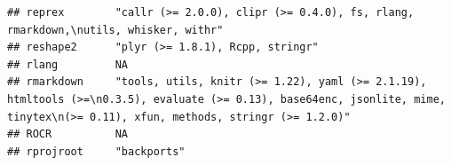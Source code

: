 \documentclass[]{article}
\begin{document}
\begin{verbatim}
## reprex        "callr (>= 2.0.0), clipr (>= 0.4.0), fs, rlang, rmarkdown,\nutils, whisker, withr"                                                                                                                                                                                                                                                                                                                                                                                                    
## reshape2      "plyr (>= 1.8.1), Rcpp, stringr"                                                                                                                                                                                                                                                                                                                                                                                                                                                      
## rlang         NA                                                                                                                                                                                                                                                                                                                                                                                                                                                                                    
## rmarkdown     "tools, utils, knitr (>= 1.22), yaml (>= 2.1.19), htmltools (>=\n0.3.5), evaluate (>= 0.13), base64enc, jsonlite, mime, tinytex\n(>= 0.11), xfun, methods, stringr (>= 1.2.0)"                                                                                                                                                                                                                                                                                                        
## ROCR          NA                                                                                                                                                                                                                                                                                                                                                                                                                                                                                    
## rprojroot     "backports"                                                                                                                                                                                                                                                                                                                                                                                                                                                                           

\end{verbatim}
\end{document}
